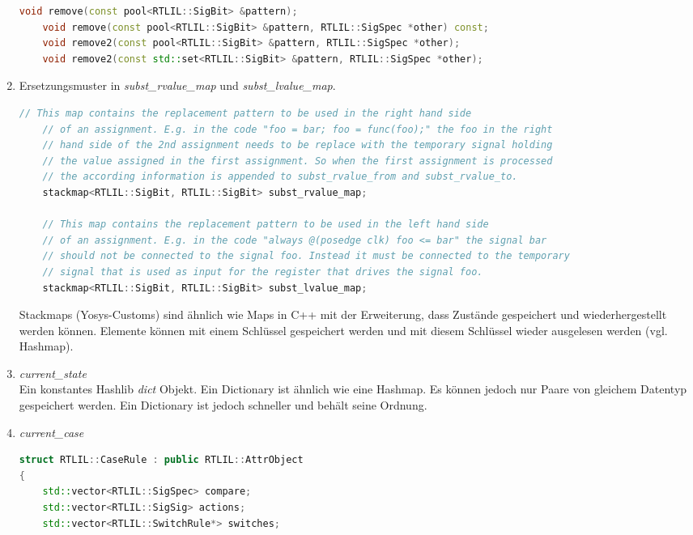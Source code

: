 \documentclass[11pt]{report}
\begin{document}
\begin{enumerate}
\begin{lstlisting}[language=C++]
	void remove(const pool<RTLIL::SigBit> &pattern);
	void remove(const pool<RTLIL::SigBit> &pattern, RTLIL::SigSpec *other) const;
	void remove2(const pool<RTLIL::SigBit> &pattern, RTLIL::SigSpec *other);
	void remove2(const std::set<RTLIL::SigBit> &pattern, RTLIL::SigSpec *other);
\end{lstlisting}

\item Ersetzungsmuster in \textit{subst\_rvalue\_map} und \textit{subst\_lvalue\_map}.
\begin{lstlisting}[language=C++]
	// This map contains the replacement pattern to be used in the right hand side
	// of an assignment. E.g. in the code "foo = bar; foo = func(foo);" the foo in the right
	// hand side of the 2nd assignment needs to be replace with the temporary signal holding
	// the value assigned in the first assignment. So when the first assignment is processed
	// the according information is appended to subst_rvalue_from and subst_rvalue_to.
	stackmap<RTLIL::SigBit, RTLIL::SigBit> subst_rvalue_map;

	// This map contains the replacement pattern to be used in the left hand side
	// of an assignment. E.g. in the code "always @(posedge clk) foo <= bar" the signal bar
	// should not be connected to the signal foo. Instead it must be connected to the temporary
	// signal that is used as input for the register that drives the signal foo.
	stackmap<RTLIL::SigBit, RTLIL::SigBit> subst_lvalue_map;
\end{lstlisting}

Stackmaps (Yosys-Customs) sind ähnlich wie Maps in C++ mit der Erweiterung, dass Zustände gespeichert und wiederhergestellt werden können. Elemente können mit einem Schlüssel gespeichert werden und mit diesem Schlüssel wieder ausgelesen werden (vgl. Hashmap).

\item \textit{current\_state} \\
Ein konstantes Hashlib \textit{dict} Objekt. Ein Dictionary ist ähnlich wie eine  Hashmap. Es können jedoch nur Paare von gleichem Datentyp gespeichert werden. Ein Dictionary ist jedoch schneller und behält seine Ordnung.
\item \textit{current\_case}\\
\begin{lstlisting}[language=C++]
struct RTLIL::CaseRule : public RTLIL::AttrObject
{
	std::vector<RTLIL::SigSpec> compare;
	std::vector<RTLIL::SigSig> actions;
	std::vector<RTLIL::SwitchRule*> switches;


\end{lstlisting}
\end{enumerate}
\end{document}

